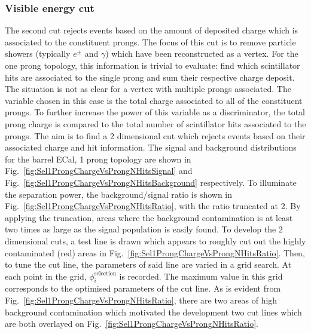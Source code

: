 \subsubsection{Visible energy cut}
\label{subsubsec:VisibleEnergyCut}
The second cut rejects events based on the amount of deposited charge which is associated to the constituent prongs. The focus of this cut is to remove particle showers (typically $e^\pm$ and $\gamma$) which have been reconstructed as a vertex.  For the one prong topology, this information is trivial to evaluate: find which scintillator hits are associated to the single prong and sum their respective charge deposit.  The situation is not as clear for a vertex with multiple prongs associated.  The variable chosen in this case is the total charge associated to all of the constituent prongs.  To further increase the power of this variable as a discriminator, the total prong charge is compared to the total number of scintillator hits associated to the prongs.  The aim is to find a 2 dimensional cut which rejects events based on their associated charge and hit information.
\newline
\newline
The signal and background distributions for the barrel ECal, 1 prong topology are shown in Fig.~\ref{fig:Sel1ProngChargeVsProngNHitsSignal} and Fig.~\ref{fig:Sel1ProngChargeVsProngNHitsBackground} respectively.  To illuminate the separation power, the background/signal ratio is shown in Fig.~\ref{fig:Sel1ProngChargeVsProngNHitsRatio}, with the ratio truncated at 2.  By applying the truncation, areas where the background contamination is at least two times as large as the signal population is easily found.  To develop the 2 dimensional cuts, a test line is drawn which appears to roughly cut out the highly contaminated (red) areas in Fig.~\ref{fig:Sel1ProngChargeVsProngNHitsRatio}.  Then, to tune the cut line, the parameters of said line are varied in a grid search.  At each point in the grid, $\phi_i^{\textrm{selection}}$ is recorded.  The maximum value in this grid corresponds to the optimised parameters of the cut line.  As is evident from Fig.~\ref{fig:Sel1ProngChargeVsProngNHitsRatio}, there are two areas of high background contamination which motivated the development two cut lines which are both overlayed on Fig.~\ref{fig:Sel1ProngChargeVsProngNHitsRatio}.
